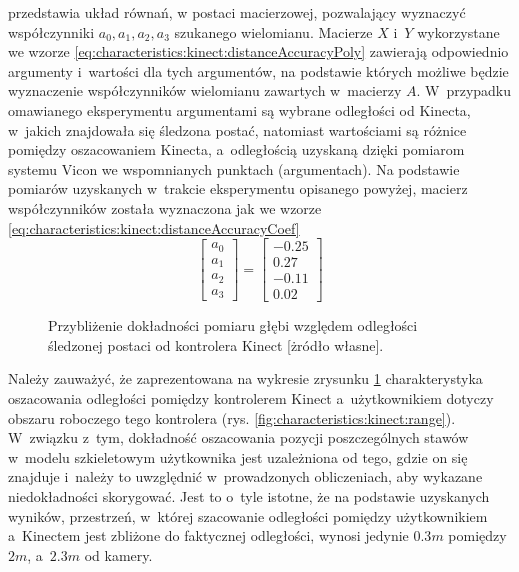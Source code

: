 przedstawia układ równań, w postaci macierzowej, pozwalający wyznaczyć współczynniki $a_0 ,a_1, a_2, a_3$ szukanego wielomianu. Macierze $X$ i~$Y$ wykorzystane we wzorze \ref{eq:characteristics:kinect:distanceAccuracyPoly} zawierają odpowiednio argumenty i~wartości dla tych argumentów, na podstawie których możliwe będzie wyznaczenie współczynników wielomianu zawartych w~macierzy $A$. W~przypadku omawianego eksperymentu argumentami są wybrane odległości od Kinecta, w~jakich znajdowała się śledzona postać, natomiast wartościami są różnice pomiędzy oszacowaniem Kinecta, a~odległością uzyskaną dzięki pomiarom systemu Vicon we wspomnianych punktach (argumentach). Na podstawie pomiarów uzyskanych w~trakcie eksperymentu opisanego powyżej, macierz współczynników została wyznaczona jak we wzorze \ref{eq:characteristics:kinect:distanceAccuracyCoef}
\begin{equation}
	\label{eq:characteristics:kinect:distanceAccuracyCoef}
	\begin{bmatrix}
		a_0 \\a_1\\a_2\\a_3
	\end{bmatrix} = 
	\begin{bmatrix}
		- 0.25 \\  0.27 \\- 0.11\\0.02		
	\end{bmatrix}	
\end{equation}
																																							
\pgfplotsset{width=12cm,compat=1.8}
																																							
\begin{savenotes}
	\begin{figure}[!htb]
		\centering
		
																																																														
		\caption[Przybliżenie dokładności pomiaru głębi względem odległości śledzonej postaci od kontrolera Kinect]{Przybliżenie dokładności pomiaru głębi względem odległości śledzonej postaci od kontrolera Kinect [żródło własne].}
		\label{fig:characteristics:kinect:distanceAccuracy}
	\end{figure}
\end{savenotes}
																																									
Należy zauważyć, że zaprezentowana na wykresie zrysunku \ref{fig:characteristics:kinect:distanceAccuracy} charakterystyka oszacowania odległości pomiędzy kontrolerem Kinect a~użytkownikiem dotyczy obszaru roboczego tego kontrolera (rys. \ref{fig:characteristics:kinect:range}). W~związku z~tym, dokładność oszacowania pozycji poszczególnych stawów w~modelu szkieletowym użytkownika jest uzależniona od tego, gdzie on się znajduje i~należy to uwzględnić w~prowadzonych obliczeniach, aby wykazane niedokładności skorygować. Jest to o~tyle istotne, że na podstawie uzyskanych wyników, przestrzeń, w~której szacowanie odległości pomiędzy użytkownikiem a~Kinectem jest zbliżone do faktycznej odległości, wynosi jedynie $0.3m$ pomiędzy $2m$, a~$2.3m$ od kamery.  
																																							
